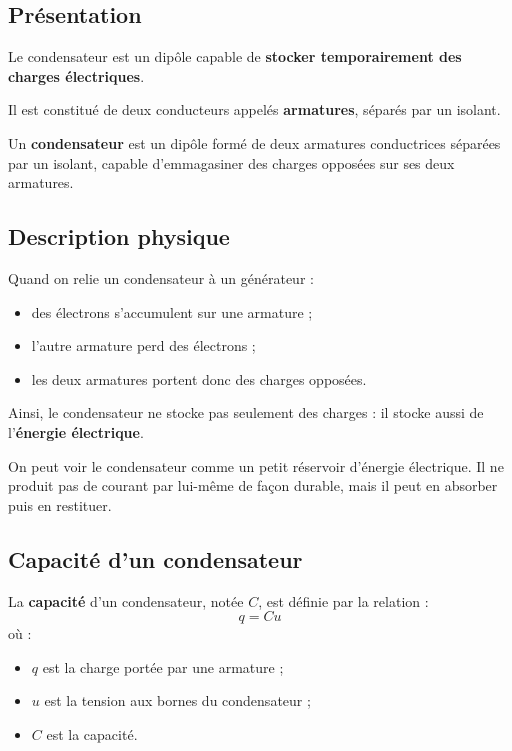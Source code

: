 \documentclass[11pt,a4paper]{article}
\begin{document}
\subsection{Présentation}

Le condensateur est un dipôle capable de \textbf{stocker temporairement des charges électriques}.

Il est constitué de deux conducteurs appelés \textbf{armatures}, séparés par un isolant.

\begin{definitionbox}
Un \textbf{condensateur} est un dipôle formé de deux armatures conductrices séparées par un isolant, capable d'emmagasiner des charges opposées sur ses deux armatures.
\end{definitionbox}

\subsection{Description physique}

Quand on relie un condensateur à un générateur :
\begin{itemize}
    \item des électrons s'accumulent sur une armature ;
    \item l'autre armature perd des électrons ;
    \item les deux armatures portent donc des charges opposées.
\end{itemize}

Ainsi, le condensateur ne stocke pas seulement des charges : il stocke aussi de l'\textbf{énergie électrique}.

\begin{analogie}
On peut voir le condensateur comme un petit réservoir d'énergie électrique. Il ne produit pas de courant par lui-même de façon durable, mais il peut en absorber puis en restituer.
\end{analogie}

\subsection{Capacité d'un condensateur}

\begin{definitionbox}
La \textbf{capacité} d'un condensateur, notée \(C\), est définie par la relation :
\[
q = Cu
\]
où :
\begin{itemize}
    \item \(q\) est la charge portée par une armature ;
    \item \(u\) est la tension aux bornes du condensateur ;
    \item \(C\) est la capacité.
\end{itemize}
\end{definitionbox}
\end{document}

